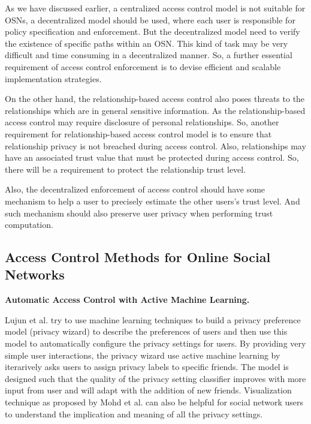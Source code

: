 \documentclass[12pt]{article}
\begin{document}
As we have discussed earlier, a centralized access control model is
not suitable for OSNs, a decentralized model should be used, where
each user is responsible for policy specification and enforcement. But
the decentralized model need to verify the existence of specific paths
within an OSN. This kind of task may be very difficult and time
consuming in a decentralized manner. So, a further essential
requirement of access control enforcement is to devise efficient and
scalable implementation strategies.

On the other hand, the relationship-based access control also poses
threats to the relationships which are in general sensitive
information. As the relationship-based access control may require
disclosure of personal relationships. So, another requirement for
relationship-based access control model is to ensure that relationship
privacy is not breached during access control. Also, relationships may
have an associated trust value that must be protected during access
control. So, there will be a requirement to protect the relationship
trust level.

Also, the decentralized enforcement of access control should have some
mechanism to help a user to precisely estimate the other users's trust
level. And such mechanism should also preserve user privacy when
performing trust computation. 

\subsection{Access Control Methods for Online Social Networks}
\textbf{Automatic Access Control with Active Machine Learning.}

Lujun et al. \cite{privacy-wizard} try to use machine learning
techniques to build a privacy preference model (privacy wizard) to
describe the preferences of users and then use this model to
automatically configure the privacy settings for users. By providing
very simple user interactions, the privacy 
wizard use active machine learning by iterarively asks users to assign
privacy labels to specific friends. The model is designed such that
the quality of the privacy setting classifier improves with more input
from user and will adapt with the addition of new
friends. Visualization technique as proposed by Mohd et
al. \cite{Anwar_visualizingprivacy} can also be helpful for social
network users to understand the implication and meaning of all the
privacy settings.
\end{document}
